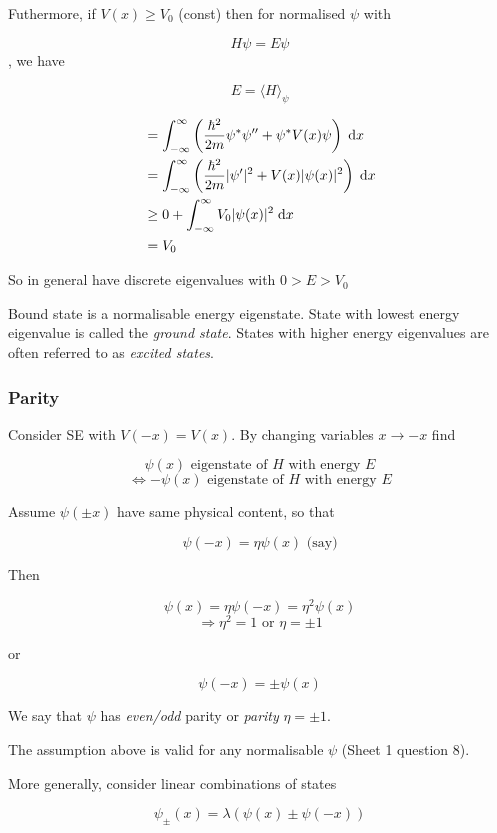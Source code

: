 \documentclass[a4paper]{article}
\begin{document}
Futhermore, if $V(x) \geq V_{0} $ (const) then for normalised $ \psi $ with 

\[ H \psi = E \psi \], we have 

\[ E = \langle H \rangle_{\psi} \]

\begin{align*}
& = \int_{-\infty}^{\infty}  \left(  \frac{\hbar^{2}}{2m} \psi^{*} \psi '' + \psi^{*}  V(x) \psi \right) \; \mathrm{d} x   \\
& = \int_{-\infty}^{\infty}  \left(  \frac{\hbar^{2}}{2m} | \psi' |^{2} + V(x) | \psi(x) |^{2} \right) \; \mathrm{d} x \\
& \geq 0 + \int_{-\infty}^{\infty} V_{0} | \psi(x) |^{2} \; \mathrm{d} x \\
& = V_{0}
\end{align*}

So in general have discrete eigenvalues with $ 0 > E > V_{0} $




Bound state is a normalisable energy eigenstate. State with lowest energy eigenvalue is called the \emph{ground state}. States with higher energy eigenvalues are often referred to as \emph{excited states}.

\subsubsection{Parity}

Consider SE with $ V(-x) = V(x) $. By changing variables $ x \to -x $ find

\[ \psi(x) \text{ eigenstate of } H \text{ with energy } E \]
\[ \iff -\psi(x) \text{ eigenstate of } H \text{ with energy } E \]

Assume $ \psi(\pm x) $ have same physical content, so that

\[ \psi(-x) = \eta \psi(x) \text{ (say)} \]

Then

\[ \psi(x) = \eta \psi(-x) = \eta^{2} \psi(x) \]
\[ \Rightarrow \eta^{2} = 1 \text{ or } \eta = \pm 1  \]

or 

\[ \psi(-x) = \pm \psi(x) \]

We say that $ \psi $ has \emph{even/odd} parity or \emph{parity} $ \eta = \pm 1 $.

The assumption above is valid for any normalisable $ \psi $ (Sheet 1 question 8).

More generally, consider linear combinations of states 

\[ \psi_{\pm}(x) = \lambda \left(   \psi(x) \pm \psi(-x ) \right) \] 
\end{document}
